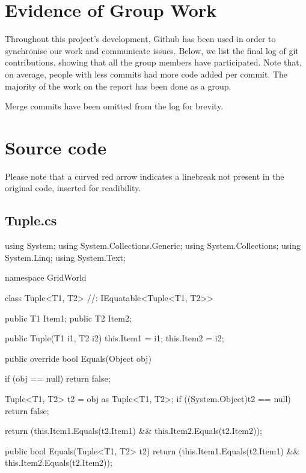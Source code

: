 \documentclass[11pt]{article}
\begin{document}
\newpage
\appendix

\section{Evidence of Group Work}
Throughout this project's development, Github has been used in order to synchronise our work and communicate issues. Below, we list the final log of git contributions, showing that all the group members have participated. Note that, on average, people with less commits had more code added per commit. The majority of the work on the report has been done as a group.

Merge commits have been omitted from the log for brevity.

\section{Source code}
Please note that a curved red arrow indicates a linebreak not present in the original code, inserted for readibility.

\subsection*{Tuple.cs}
\begin{code}
using System;
using System.Collections.Generic;
using System.Collections;
using System.Linq;
using System.Text;

namespace GridWorld
{
    class Tuple<T1, T2> //: IEquatable<Tuple<T1, T2>>
    {
        public T1 Item1;
        public T2 Item2;

        public Tuple(T1 i1, T2 i2) {
            this.Item1 = i1;
            this.Item2 = i2;
        }
   
        public override bool Equals(Object obj) {
            if (obj == null)
            {
                return false;
            }

            Tuple<T1, T2> t2 = obj as Tuple<T1, T2>;
            if ((System.Object)t2 == null)
            {
                return false;
            }
            
            return (this.Item1.Equals(t2.Item1) && this.Item2.Equals(t2.Item2));
        }

        public bool Equals(Tuple<T1, T2> t2)
        {
            return (this.Item1.Equals(t2.Item1) && this.Item2.Equals(t2.Item2));
        }
    }
}
\end{code}
\end{document}
